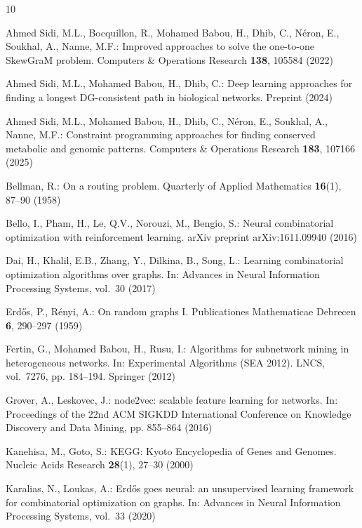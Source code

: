 \documentclass{llncs}
\begin{document}
\begin{thebibliography}{10}

Ahmed Sidi, M.L., Bocquillon, R., Mohamed Babou, H., Dhib, C., Néron, E., Soukhal, A., Nanne, M.F.: Improved approaches to solve the one-to-one SkewGraM problem. Computers \& Operations Research \textbf{138}, 105584 (2022)

Ahmed Sidi, M.L., Mohamed Babou, H., Dhib, C.: Deep learning approaches for finding a longest DG-consistent path in biological networks. Preprint (2024)

Ahmed Sidi, M.L., Mohamed Babou, H., Dhib, C., Néron, E., Soukhal, A., Nanne, M.F.: Constraint programming approaches for finding conserved metabolic and genomic patterns. Computers \& Operations Research \textbf{183}, 107166 (2025)

Bellman, R.: On a routing problem. Quarterly of Applied Mathematics \textbf{16}(1), 87--90 (1958)

Bello, I., Pham, H., Le, Q.V., Norouzi, M., Bengio, S.: Neural combinatorial optimization with reinforcement learning. arXiv preprint arXiv:1611.09940 (2016)

Dai, H., Khalil, E.B., Zhang, Y., Dilkina, B., Song, L.: Learning combinatorial optimization algorithms over graphs. In: Advances in Neural Information Processing Systems, vol.~30 (2017)

Erd\H{o}s, P., Rényi, A.: On random graphs I. Publicationes Mathematicae Debrecen \textbf{6}, 290--297 (1959)

Fertin, G., Mohamed Babou, H., Rusu, I.: Algorithms for subnetwork mining in heterogeneous networks. In: Experimental Algorithms (SEA 2012). LNCS, vol.~7276, pp. 184--194. Springer (2012)

Grover, A., Leskovec, J.: node2vec: scalable feature learning for networks. In: Proceedings of the 22nd ACM SIGKDD International Conference on Knowledge Discovery and Data Mining, pp. 855--864 (2016)

Kanehisa, M., Goto, S.: KEGG: Kyoto Encyclopedia of Genes and Genomes. Nucleic Acids Research \textbf{28}(1), 27--30 (2000)

Karalias, N., Loukas, A.: Erd\H{o}s goes neural: an unsupervised learning framework for combinatorial optimization on graphs. In: Advances in Neural Information Processing Systems, vol.~33 (2020)


\end{thebibliography}
\end{document}
